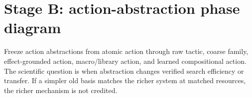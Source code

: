 \section{Stage B: action-abstraction phase diagram}
Freeze action abstractions from atomic action through raw tactic, coarse family, effect-grounded action, macro/library action, and learned compositional action. The scientific question is when abstraction changes verified search efficiency or transfer. If a simpler old basis matches the richer system at matched resources, the richer mechanism is not credited.

